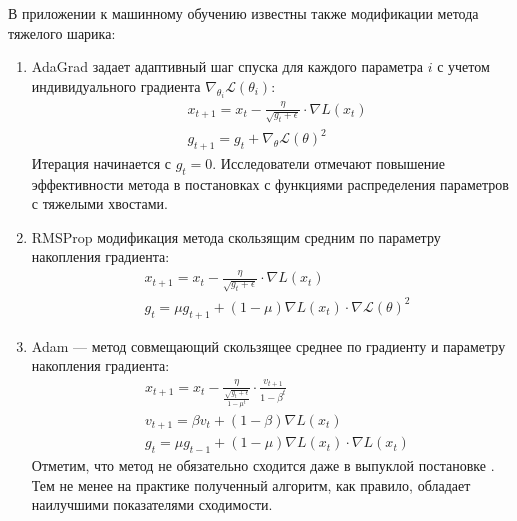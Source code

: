 В приложении к машинному обучению известны также модификации метода тяжелого шарика:
\begin{enumerate}
    \item AdaGrad \cite{duchi2011adaptive} задает адаптивный шаг спуска для каждого параметра $i$
    с учетом индивидуального градиента $\nabla_{\theta_i} \mathcal{L}(\theta_i)$:
        \begin{equation}
            \begin{aligned}
                &x_{t+1} = x_t - \frac{\eta}{\sqrt{g_t+\epsilon}} \cdot \nabla L(x_t) \\
                &g_{t+1} = g_t + \nabla_\theta \mathcal{L}(\theta)^2
            \end{aligned}
        \end{equation}
    Итерация начинается с $g_t=0$. Исследователи отмечают повышение эффективности метода в постановках с функциями распределения параметров 
    с тяжелыми хвостами.
    \item RMSProp \cite{krizhevsky2012imagenet} модификация метода скользящим средним по параметру накопления градиента:
        \begin{equation}
            \begin{aligned}
                &x_{t+1} = x_t - \frac{\eta}{\sqrt{g_t+\epsilon}} \cdot \nabla L(x_t) \\
                &g_t = \mu g_{t+1} + (1-\mu)\nabla L(x_t) \cdot \nabla \mathcal{L}(\theta)^2
            \end{aligned}
        \end{equation}
    \item Adam \cite{kingma2014adam} --- метод совмещающий скользящее среднее по градиенту и параметру накопления градиента:
        \begin{equation}
            \begin{aligned}
                &x_{t+1} = x_t - \frac{\eta}{\frac{\sqrt{g_t+\epsilon}}{1-\mu^t}} \cdot \frac{v_{t+1}}{1-\beta^t} \\
                &v_{t+1} = \beta v_t + (1-\beta) \nabla L(x_t) \\
                &g_t = \mu g_{t-1} + (1-\mu)\nabla L(x_t) \cdot \nabla  L(x_t)
            \end{aligned}
        \end{equation}
    Отметим, что метод не обязательно сходится даже в выпуклой постановке \cite{reddi2019convergence}. Тем не менее на практике полученный
    алгоритм, как правило, обладает наилучшими показателями сходимости.
\end{enumerate}


